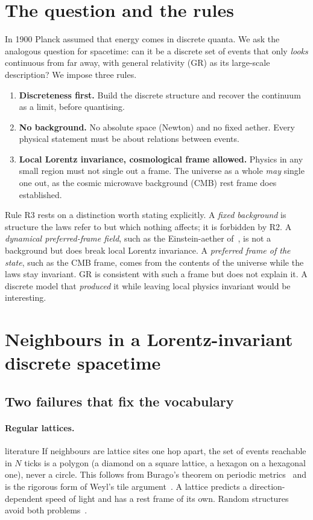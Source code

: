 \documentclass[11pt,a4paper]{article}
\newcommand{\tagbox}[2]{\textsf{\scriptsize\colorbox{#1!12}{\textcolor{#1!70!black}{#2}}}}
\newcommand{\est}{\tagbox{gray}{established}}
\newcommand{\lit}{\tagbox{blue}{literature}}
\begin{document}
\section{The question and the rules}
In 1900 Planck assumed that energy comes in discrete quanta. We ask the analogous question for spacetime: can it be a discrete set of events that only \emph{looks} continuous from far away, with general relativity (GR) as its large-scale description? We impose three rules.
\begin{enumerate}[label=\textbf{R\arabic*},leftmargin=*]
\item \textbf{Discreteness first.} Build the discrete structure and recover the continuum as a limit, before quantising.
\item \textbf{No background.} No absolute space (Newton) and no fixed aether. Every physical statement must be about relations between events.
\item \textbf{Local Lorentz invariance, cosmological frame allowed.} Physics in any small region must not single out a frame. The universe as a whole \emph{may} single one out, as the cosmic microwave background (CMB) rest frame does \est.
\end{enumerate}
Rule R3 rests on a distinction worth stating explicitly. A \emph{fixed background} is structure the laws refer to but which nothing affects; it is forbidden by R2. A \emph{dynamical preferred-frame field}, such as the Einstein-aether of~\cite{JacobsonMattingly01}, is not a background but does break local Lorentz invariance. A \emph{preferred frame of the state}, such as the CMB frame, comes from the contents of the universe while the laws stay invariant. GR is consistent with such a frame but does not explain it. A discrete model that \emph{produced} it while leaving local physics invariant would be interesting.

\section{Neighbours in a Lorentz-invariant discrete spacetime}
\subsection{Two failures that fix the vocabulary}
\paragraph{Regular lattices.} \lit{} If neighbours are lattice sites one hop apart, the set of events reachable in $N$ ticks is a polygon (a diamond on a square lattice, a hexagon on a hexagonal one), never a circle. This follows from Burago's theorem on periodic metrics~\cite{Burago} and is the rigorous form of Weyl's tile argument~\cite{Weyl}. A lattice predicts a direction-dependent speed of light and has a rest frame of its own. Random structures avoid both problems~\cite{VahidiAslWierman}.
\end{document}
